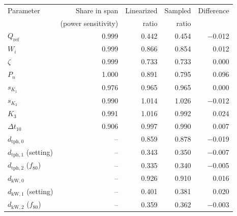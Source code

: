 \begin{tabular}{@{}lrrrr@{}}
\toprule
Parameter & Share in span & Linearized & Sampled & Difference \\
 & (power sensitivity) & ratio & ratio & \\
\midrule
$Q_{\mathrm{ref}}$ & 0.999 & 0.442 & 0.454 & $-$0.012 \\
$W_i$ & 0.999 & 0.866 & 0.854 & 0.012 \\
$\zeta$ & 0.999 & 0.733 & 0.733 & 0.000 \\
$P_n$ & 1.000 & 0.891 & 0.795 & 0.096 \\
$s_{K_1}$ & 0.976 & 0.965 & 0.965 & 0.000 \\
$s_{K_2}$ & 0.990 & 1.014 & 1.026 & $-$0.012 \\
$K_3$ & 0.991 & 1.016 & 0.992 & 0.024 \\
$\Delta t_{10}$ & 0.906 & 0.997 & 0.990 & 0.007 \\
\midrule
$d_{\mathrm{tph},0}$ & -- & 0.859 & 0.878 & $-$0.019 \\
$d_{\mathrm{tph},1}$ (setting) & -- & 0.343 & 0.350 & $-$0.007 \\
$d_{\mathrm{tph},2}$ ($f_{80}$) & -- & 0.335 & 0.340 & $-$0.005 \\
$d_{\mathrm{kW},0}$ & -- & 0.926 & 0.910 & 0.016 \\
$d_{\mathrm{kW},1}$ (setting) & -- & 0.401 & 0.381 & 0.020 \\
$d_{\mathrm{kW},2}$ ($f_{80}$) & -- & 0.359 & 0.362 & $-$0.003 \\
\bottomrule
\end{tabular}
